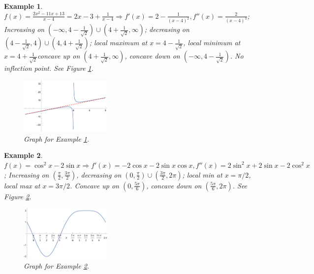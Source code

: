 \documentclass[letterpaper, 11pt, openany]{book}
\theoremstyle{mytheoremstyle}
\theoremstyle{myexamplestyle}
\newtheorem{example}{Example}[section]
\begin{document}
\begin{example}\label{e:graph-rational-oblique}
    \(\displaystyle f(x) = \frac{2 x^2-11 x+13}{x-4} =  2x - 3 +  \frac{1}{x-4} \Rightarrow f'(x) = 2-\frac{1}{(x-4)^2}, f''(x) = \frac{2}{(x-4)^3}\); Increasing on \(\left(-\infty, 4-\frac{1}{\sqrt{2}}\right)\cup \left(4+\frac{1}{\sqrt{2}}, \infty\right)\); decreasing on \(\left(4-\frac{1}{\sqrt{2}},4\right)\cup\left(4,4+\frac{1}{\sqrt{2}}\right)\); local maximum at \(x=4-\frac{1}{\sqrt{2}}\), local minimum at \(x=4+\frac{1}{\sqrt{2}}\)concave up on \(\left(4+\frac{1}{\sqrt{2}}, \infty\right)\), concave down on \(\left(-\infty,4-\frac{1}{\sqrt{2}}\right)\). No inflection point. See Figure \ref{f:graph-rational-oblique}.
    \begin{figure}[htbp]
        \centering
            \includegraphics[width=0.4\textwidth]{Figures/graphing-rational-oblique.pdf}
        \caption{Graph for Example \ref{e:graph-rational-oblique}.}
        \label{f:graph-rational-oblique}
    \end{figure}
\end{example}


\begin{example}\label{e:graph-trig}
    \(f(x) = \cos^2 x - 2\sin x \Rightarrow f'(x) = -2 \cos x-2 \sin x \cos x, f''(x) = 2 \sin ^2 x + 2 \sin x -2 \cos ^2 x \); Increasing on \( \left(\frac{\pi}{2}, \frac{3\pi}{2}\right) \), decreasing on \( \left( 0, \frac{\pi}{2}\right) \cup \left( \frac{3\pi}{2}, 2\pi \right)\); local min at \(x = \pi/2\), local max at \(x = 3\pi /2\). Concave up on \(\left(0, \frac{5\pi}{6}\right)\), concave down on \(\left(\frac{5\pi}{6}, 2\pi\right)\). See Figure \ref{f:graph-trig}.
    \begin{figure}[htbp]
        \centering
            \includegraphics[width=0.4\textwidth]{Figures/graphing-trig.pdf}
        \caption{Graph for Example \ref{e:graph-trig}.}
        \label{f:graph-trig}
    \end{figure}
\end{example}
\end{document}
